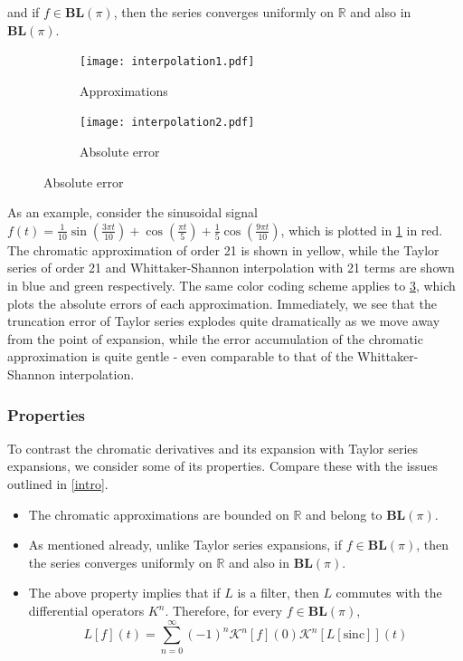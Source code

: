 \documentclass[11pt,oneside]{book}
\theoremstyle{plain}
\theoremstyle{definition}
\theoremstyle{remark}
\begin{document}
and if $f \in \mathbf{BL}(\pi)$, then the series converges uniformly on $\mathbb{R}$ 
and also in $\mathbf{BL}(\pi)$.

\begin{figure}[H]
  \centering
  \caption{Plot of sinusoidal $\frac{1}{10} \sin \left(\frac{3 \pi  t}{10}\right)+\cos \left(\frac{\pi  t}{5}\right)+\frac{1}{5} \cos \left(\frac{9 \pi  t}{10}\right)$ (red), its Taylor series approximation (blue), Shannon-Whittaker interpolation (green) and chromatic approximation (yellow), all with 21 terms.}
  \begin{subfigure}[b]{0.49\textwidth}
    \texttt{[image: interpolation1.pdf]}
    \caption{Approximations}
    \label{fig:interpolation1}
  \end{subfigure}
  \hfill
  \begin{subfigure}[b]{0.49\textwidth}
    \texttt{[image: interpolation2.pdf]}
    \caption{Absolute error}
    \label{fig:interpolation2}
  \end{subfigure}
\end{figure}

As an example, consider the sinusoidal signal $f(t) = \frac{1}{10} \sin \left(\frac{3 \pi  t}{10}\right)+\cos 
\left(\frac{\pi  t}{5}\right)+\frac{1}{5} \cos \left(\frac{9 \pi t}{10}\right)$, which is plotted in \cref{fig:interpolation1} 
in red. The chromatic approximation of order 21 is shown in yellow, while the Taylor series of order 21 and Whittaker-Shannon 
interpolation with 21 terms are shown in blue and green respectively. The same color coding scheme applies to \cref{fig:interpolation2},
which plots the absolute errors of each approximation. Immediately, we see that the truncation error of Taylor series
explodes quite dramatically as we move away from the point of expansion, while the error accumulation of the chromatic
approximation is quite gentle - even comparable to that of the Whittaker-Shannon interpolation.

\subsubsection{Properties} 

To contrast the chromatic derivatives and its expansion with Taylor series expansions,
we consider some of its properties. Compare these with the issues outlined in \cref{intro}. 

\begin{itemize}
  \item The chromatic approximations are bounded on $\mathbb{R}$ and belong to $\mathbf{BL}(\pi)$.
  \item As mentioned already, unlike Taylor series expansions, if $f \in \mathbf{BL}(\pi)$, 
    then the series converges uniformly on $\mathbb{R}$ and also in $\mathbf{BL}(\pi)$.
  \item The above property implies that if $L$ is a filter, then $L$ commutes with the differential
    operators $K^n$. Therefore, for every $f \in \mathbf{BL}(\pi)$,
    \begin{equation}
      L[f](t) = \sum_{n=0}^{\infty} (-1)^n \mathcal{K}^n[f](0) \mathcal{K}^n[L[\mathrm{sinc}]](t)
    \end{equation}
\end{itemize}
\end{document}
